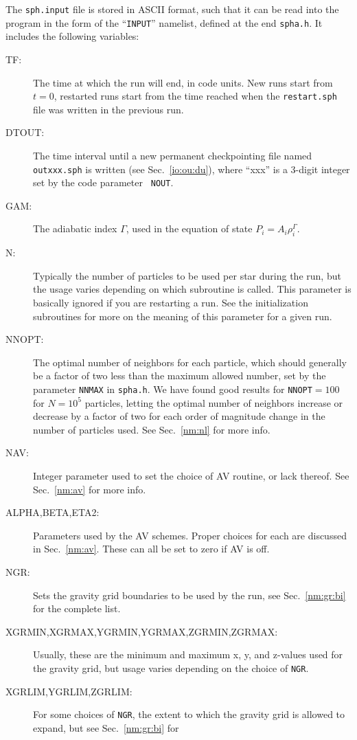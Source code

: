 The {\tt sph.input} file is stored in ASCII format, such that it can
be read into the program in the form of the ``{\tt INPUT}'' namelist,
defined at the end {\tt spha.h}.  It includes the following variables:
\begin{description}
\item[TF:] The time at which the run will end, in code units.  New
runs start from $t=0$, restarted runs start from the time reached when
the {\tt restart.sph} file was written in the previous run.
\item[DTOUT:] The time interval until a new permanent checkpointing
file named {\tt outxxx.sph} is written (see Sec.~\ref{io:ou:du}),
where ``xxx'' is a 3-digit integer set by the code parameter {\tt
NOUT}.
\item[GAM:] The adiabatic index $\Gamma$, used in the equation of
state $P_i=A_i\rho_i^{\Gamma}$.
\item[N:] Typically the number of particles to be used per star during
the run, but the usage varies depending on which subroutine is
called.  This parameter is basically ignored if you are restarting a
run.  See the initialization subroutines for more on the meaning of
this parameter for a given run.
\item[NNOPT:] The optimal number of neighbors for each particle, which
should generally be a factor of two less than the maximum allowed
number, set by the parameter {\tt NNMAX} in {\tt spha.h}.  We have
found good results for {\tt NNOPT}$=100$ for $N=10^5$ particles,
letting the optimal number of neighbors increase or decrease by a
factor of two for each order of magnitude change in the number of
particles used.  See Sec.~\ref{nm:nl} for more info.
\item[NAV:] Integer parameter used to set the choice of AV routine, or
lack thereof.  See Sec.~\ref{nm:av} for more info.
\item[ALPHA,BETA,ETA2:] Parameters used by the AV schemes.  Proper
choices for each are discussed in Sec.~\ref{nm:av}.  These can all be set
to zero if AV is off.
\item[NGR:] Sets the gravity grid boundaries to be used by the run,
see Sec.~\ref{nm:gr:bi} for the complete list.
\item[XGRMIN,XGRMAX,YGRMIN,YGRMAX,ZGRMIN,ZGRMAX:] Usually, these are the
minimum and maximum x, y, and z-values used for the gravity grid, but
usage varies depending on the choice of {\tt NGR}.
\item[XGRLIM,YGRLIM,ZGRLIM:] For some choices of {\tt NGR}, the extent
to which the gravity grid is allowed to expand, but see Sec.~\ref{nm:gr:bi} for

\end{description}

